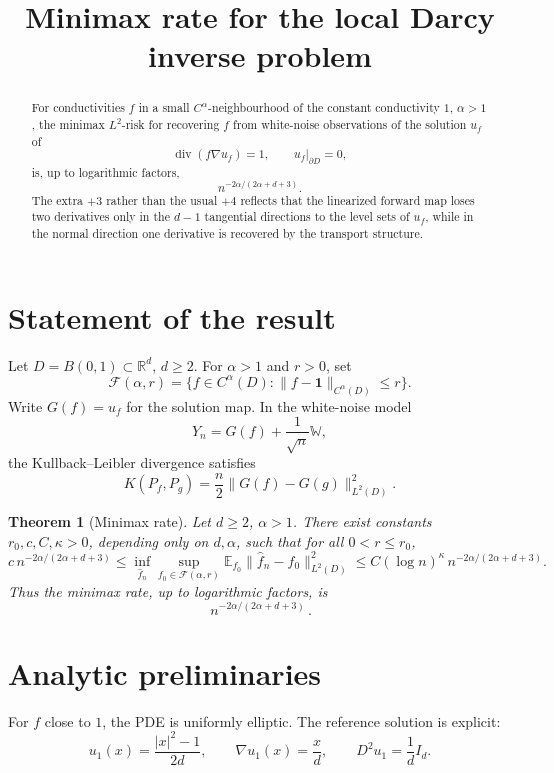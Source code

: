 \documentclass[11pt]{article}
\newtheorem{theorem}{Theorem}
\newcommand{\R}{\mathbb R}
\newcommand{\bbone}{\mathbf 1}
\newcommand{\Div}{\operatorname{div}}
\newcommand{\E}{\mathbb E}
\newcommand{\cF}{\mathcal F}
\begin{document}
\title{Minimax rate for the local Darcy inverse problem}
\author{}
\date{}
\maketitle

\begin{abstract}
For conductivities \(f\) in a small \(C^\alpha\)-neighbourhood of the constant conductivity \(1\), \(\alpha>1\), the minimax \(L^2\)-risk for recovering \(f\) from white-noise observations of the solution \(u_f\) of
\[
 \Div(f\nabla u_f)=1,\qquad u_f|_{\partial D}=0,
\]
is, up to logarithmic factors,
\[
 n^{-2\alpha/(2\alpha+d+3)}.
\]
The extra \(+3\) rather than the usual \(+4\) reflects that the linearized forward map loses two derivatives only in the \(d-1\) tangential directions to the level sets of \(u_f\), while in the normal direction one derivative is recovered by the transport structure.
\end{abstract}

\section{Statement of the result}

Let \(D=B(0,1)\subset\R^d\), \(d\ge2\). For \(\alpha>1\) and \(r>0\), set
\[
 \cF(\alpha,r)
 =
 \bigl\{
 f\in C^\alpha(D): \|f-\bbone\|_{C^\alpha(D)}\le r
 \bigr\}.
\]
Write \(G(f)=u_f\) for the solution map. In the white-noise model
\[
 Y_n=G(f)+\frac1{\sqrt n}\mathbb W,
\]
the Kullback--Leibler divergence satisfies
\[
 K(P_f,P_g)=\frac n2\|G(f)-G(g)\|_{L^2(D)}^2.
\]

\begin{theorem}[Minimax rate]
\label{thm:main}
Let \(d\ge2\), \(\alpha>1\). There exist constants \(r_0,c,C,\kappa>0\), depending only on \(d,\alpha\), such that for all \(0<r\le r_0\),
\[
 c\, n^{-2\alpha/(2\alpha+d+3)}
 \le
 \inf_{\widehat f_n}
 \sup_{f_0\in\cF(\alpha,r)}
 \E_{f_0}\|\widehat f_n-f_0\|_{L^2(D)}^2
 \le
 C(\log n)^\kappa\, n^{-2\alpha/(2\alpha+d+3)}.
\]
Thus the minimax rate, up to logarithmic factors, is
\[
 \boxed{\,n^{-2\alpha/(2\alpha+d+3)}\, }.
\]
\end{theorem}

\section{Analytic preliminaries}

For \(f\) close to \(1\), the PDE is uniformly elliptic. The reference solution is explicit:
\[
 u_1(x)=\frac{|x|^2-1}{2d},\qquad \nabla u_1(x)=\frac{x}{d},\qquad D^2u_1=\frac1d I_d.
\]
\end{document}
